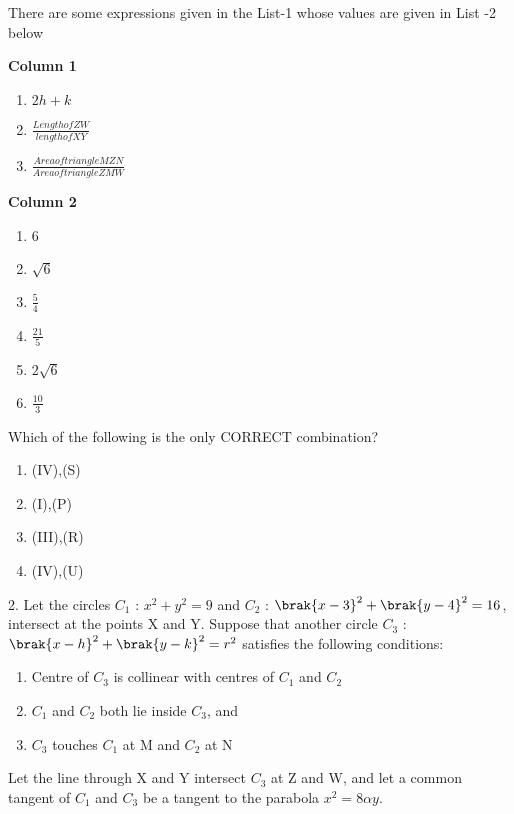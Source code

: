 \documentclass[journal,12pt,twocolumn]{IEEEtran}
\theoremstyle{remark}
\begin{document}
There are some expressions given in the List-1 whose values are given in List -2 below
\begin{multicols}{2}

\textbf{Column 1}
\begin{enumerate}[label=(\Alph*)]           
\item $2h+k$                                  
\item $\frac{Length of ZW}{length of XY}$     
\item $\frac{Area of triangle MZN}{Area of triangle ZMW}$                     \end{enumerate}                              
\columnbreak
 \textbf{Column 2}
 \begin{enumerate}[label=(\alph*) , start=16]
 \item 6
 \item $\sqrt{6}$
 \item $\frac{5}{4}$                           
 \item $\frac{21}{5}$                          
 \item $2\sqrt{6}$                             
 \item $\frac{10}{3}$                         
 \end{enumerate}
 \end{multicols}
 Which of the following is the only CORRECT combination?                                    
\begin{enumerate}[label=(\alph*)]            
 \item (IV),(S)
 \item (I),(P)
 \item (III),(R)    
 \item (IV),(U)
 \end{enumerate}


2. Let the circles $C_{1}$ : $x^2+y^2=9$ and $C_{2}$ : $\brak{x-3}^2+\brak{y-4}^2=16$, intersect at the points X and Y. Suppose that another circle $C_{3}$ : $\brak{x-h}^2+\brak{y-k}^2=r^2$ satisfies the following conditions: 

\begin{enumerate}[label=(\roman*)]                       
\item Centre of $C_{3}$ is collinear with centres of $C_{1}$ and $C_{2}$                         
\item $C_{1}$ and $C_{2}$ both lie inside $C_{3}$, and                                            
\item $C_{3}$ touches $C_{1}$ at M and $C_{2}$ at N
\end{enumerate}                              
Let the line through X and Y intersect $C_{3}$ at Z and W, and let a common tangent of $C_{1}$ and $C_{3}$ be a tangent to the parabola $x^2=8\alpha y$.
\end{document}
